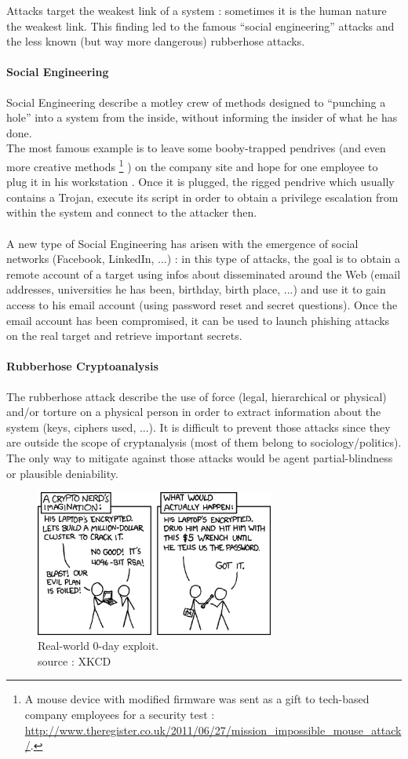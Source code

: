 Attacks target the weakest link of a system : sometimes it is the human nature the weakest link. This finding led to the famous ``social engineering'' attacks and the less known (but way more dangerous) rubberhose attacks.

\paragraph{Social Engineering}

Social Engineering describe a motley crew of methods designed to ``punching a hole'' into a system from the inside, without informing the insider of what he has done. \\
The most famous example is to leave some booby-trapped pendrives (and even more creative methods 
\footnote{ A mouse device with modified firmware was sent as a gift to tech-based company employees for a security test : \url{ http://www.theregister.co.uk/2011/06/27/mission_impossible_mouse_attack/}.  }
) on the company site and hope for one employee to plug it in his workstation . Once it is plugged, the rigged pendrive which usually contains a Trojan, execute its script in order to obtain a privilege escalation from within the system and connect to the attacker then.\\\\
A new type of Social Engineering has arisen with the emergence of social networks (Facebook, LinkedIn, ...) : in this type of attacks, the goal is to obtain a remote account of a target using infos about disseminated around the Web (email addresses, universities he has been, birthday, birth place, ...) and use it to gain access to his email account (using password reset and secret questions). Once the email account has been compromised, it can be used to launch phishing attacks on the real target and retrieve important secrets.


\paragraph{Rubberhose Cryptoanalysis}

The rubberhose attack describe the use of force (legal, hierarchical or physical) and/or torture on a physical person in order to extract information about the system (keys, ciphers used, ...). It is difficult to prevent those attacks since they are outside the scope of cryptanalysis (most of them belong to sociology/politics). The only way to mitigate against those attacks would be agent partial-blindness or plausible deniability.

\begin{figure}[hb!]
    \centering
       \includegraphics[width=0.7\textwidth]{images/rubberhose.png}
	\caption{Real-world 0-day exploit. \\ source : XKCD}
	\label{fig:RC4}
\end{figure}
